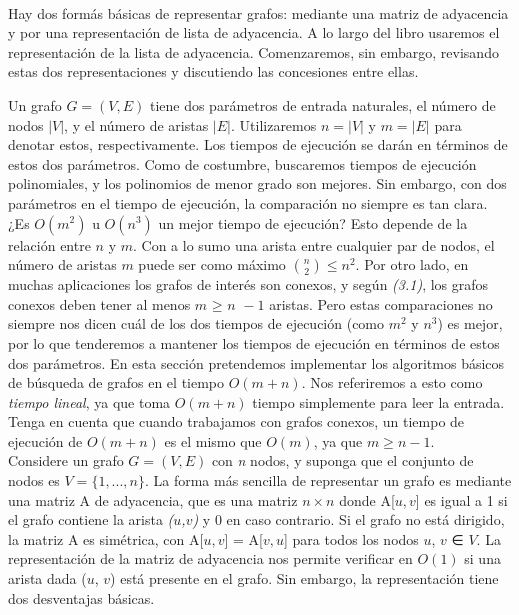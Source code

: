 \documentclass[a4paper]{article}
\begin{document}
\paragraph{}
Hay dos formás básicas de representar grafos: mediante una matriz de adyacencia y por una representación de lista de adyacencia. A lo largo del libro usaremos el representación de la lista de adyacencia. Comenzaremos, sin embargo, revisando estas dos representaciones y discutiendo las concesiones entre ellas.

Un grafo \(G = (V, E)\) tiene dos parámetros de entrada naturales, el número de nodos \(|V|\), y el número de aristas \(|E|\). Utilizaremos \( n = |V|\) y \(m = |E|\) para denotar estos, respectivamente. Los tiempos de ejecución se darán en términos de estos dos parámetros. Como de costumbre, buscaremos tiempos de ejecución polinomiales, y los polinomios de menor grado son mejores. Sin embargo, con dos parámetros en el tiempo de ejecución, la comparación no siempre es tan clara. ¿Es \(O(m^{2})\) u \(O(n^{3})\) un mejor tiempo de ejecución? Esto depende de la relación entre $n$ y $m$. Con a lo sumo una arista entre cualquier par de nodos, el número de aristas $m$ puede ser como máximo \(\binom{n}{2} ≤ n^{2}\). Por otro lado, en muchas aplicaciones los grafos de interés son conexos, y según \textit{(3.1)}, los grafos conexos deben tener al menos \(\textit{m ≥ n }- 1\) aristas. Pero estas comparaciones no siempre nos dicen cuál de los dos tiempos de ejecución (como \(m^{2}\) y \(n^{3}\)) es mejor, por lo que tenderemos a mantener los tiempos de ejecución en términos de estos dos parámetros. En esta sección pretendemos implementar los algoritmos básicos de búsqueda de grafos en el tiempo \(O(m+n)\). Nos referiremos a esto como \textit{tiempo lineal}, ya que toma \(O(m+n)\) tiempo simplemente para leer la entrada. Tenga en cuenta que cuando trabajamos con grafos conexos, un tiempo de ejecución de \(O(m+n)\) es el mismo que \(O(m)\), ya que \( m ≥ n - 1.\)\\ 

Considere un grafo $G = (V, E)$ con \textit{n} nodos, y suponga que el conjunto de nodos es $V = \{1,. . . , n\}$. La forma más sencilla de representar un grafo es mediante una matriz A de adyacencia, que es una matriz \(n × n\) donde A[$u,v$] es igual a 1 si el grafo contiene la arista \textit{($u$,$v$)} y 0 en caso contrario. Si el grafo no está dirigido, la matriz A es simétrica, con A[$u,v$] = A[$v,u$] para todos los nodos $u$, $v$ ∈ $V$. La representación de la matriz de adyacencia nos permite verificar en \(O(1)\) si una arista dada ($u$, $v$) está presente en el grafo. Sin embargo, la representación tiene dos desventajas básicas.
\end{document}
